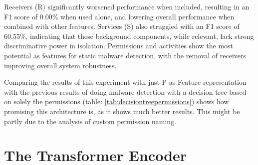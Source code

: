 Receivers (R) significantly worsened performance when included, 
resulting in an F1 score of 0.00\% when used alone, and lowering overall 
performance when combined with other features. 
Services (S) also struggled with an F1 score of 60.55\%, 
indicating that these background components, while relevant, 
lack strong discriminative power in isolation. 
Permissions and activities show the most potential as features for static malware detection, 
with the removal of receivers improving overall system robustness.

Comparing the results of this experiment with just P as Feature representation with 
the previous results of doing malware detection with a decision tree based on solely 
the permissions (table: \ref{tab:decisiontreepermissions}) shows how promising this architecture is, 
as it shows much better results. 
This might be partly due to the analysis of custom permission naming.


\section{The Transformer Encoder}

\begin{table}[b!]
    \caption{\label{tab:apk_representation_results_unfrozen}%
    Performance of different APK representations using \emph{unfrozen} modernBERT embeddings. Features are extracted from the Android manifest.xml (A=Activities, P=Permissions, R=Receivers, S=Services). The encoder was also trained through backpropagation in this experiment.}
\end{table}

